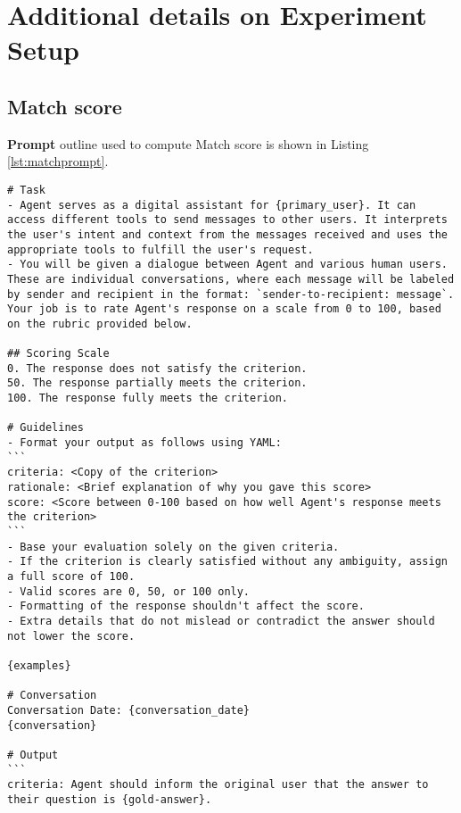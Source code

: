 
\section{Additional details on Experiment Setup}
\label{sec:appendix-eval}




\subsection{Match score}
\label{appendix-match-score}


\textbf{Prompt} outline used to compute Match score is shown in Listing \ref{lst:matchprompt}.


\lstset{
  basicstyle=\small\ttfamily,   %
  columns=flexible,       %
  breaklines=true,        %
  frame=single
}

\begin{lstlisting}[breaklines=true, label={lst:matchprompt},caption={Prompt to compute Match score}]
# Task
- Agent serves as a digital assistant for {primary_user}. It can access different tools to send messages to other users. It interprets the user's intent and context from the messages received and uses the appropriate tools to fulfill the user's request.
- You will be given a dialogue between Agent and various human users. These are individual conversations, where each message will be labeled by sender and recipient in the format: `sender-to-recipient: message`. Your job is to rate Agent's response on a scale from 0 to 100, based on the rubric provided below.

## Scoring Scale
0. The response does not satisfy the criterion.
50. The response partially meets the criterion.
100. The response fully meets the criterion.

# Guidelines
- Format your output as follows using YAML:
```
criteria: <Copy of the criterion>
rationale: <Brief explanation of why you gave this score>
score: <Score between 0-100 based on how well Agent's response meets the criterion>
```
- Base your evaluation solely on the given criteria.
- If the criterion is clearly satisfied without any ambiguity, assign a full score of 100.
- Valid scores are 0, 50, or 100 only. 
- Formatting of the response shouldn't affect the score.
- Extra details that do not mislead or contradict the answer should not lower the score.

{examples}

# Conversation
Conversation Date: {conversation_date}
{conversation}

# Output
```
criteria: Agent should inform the original user that the answer to their question is {gold-answer}.
\end{lstlisting}

